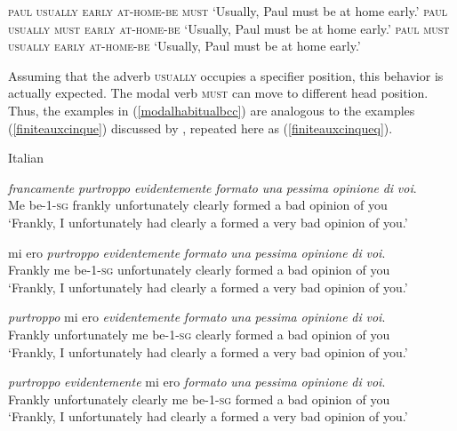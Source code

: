 \begin{exe}
\ex\label{modalhabitualbcc}\begin{xlist} 
\ex \textsc{paul usually early at-home-be must}
\glt `Usually, Paul must be at home early.'
\ex \textsc{paul usually must early at-home-be}
\glt `Usually, Paul must be at home early.'
\ex \textsc{paul must usually early at-home-be}
\glt `Usually, Paul must be at home early.'
\end{xlist}
\end{exe} 

\noindent Assuming that the adverb \textsc{usually} occupies a specifier position, this behavior is actually expected. The modal verb \textsc{must} can move to different head position. Thus, the examples in (\ref{modalhabitualbcc}) are analogous to the examples (\ref{finiteauxcinque}) discussed by \citet[49]{cinque1999adverbs}, repeated here as (\ref{finiteauxcinqueq}). 

\begin{exe} 
\ex Italian \citep[49]{cinque1999adverbs}\label{finiteauxcinqueq} \begin{xlist} 
\ex {} {\textit{francamente}} {\textit{purtroppo}} {\textit{evidentemente}} {\textit{formato}} {\textit{una}} {\textit{pessima}} {\textit{opinione}} {\textit{di}} {\textit{voi}.}  \\
{Me be-1-\textsc{sg}} {frankly} {unfortunately} {clearly} {formed} {a} {bad} {opinion} {of} {you} \\
\trans `Frankly, I unfortunately had clearly a formed a very bad opinion of you.' \label{finiteauxcinqueaq}

\ex {} {mi ero} {\textit{purtroppo}} {\textit{evidentemente}} {\textit{formato}} {\textit{una}} {\textit{pessima}} {\textit{opinione}} {\textit{di}} {\textit{voi}.}  \\
 {Frankly} {me be-1-\textsc{sg}} {unfortunately} {clearly} {formed} {a} {bad} {opinion} {of} {you} \\
\trans `Frankly, I unfortunately had clearly a formed a very bad opinion of you.' \label{finiteauxcinquebq}

\ex {}  {\textit{purtroppo}} {mi ero} {\textit{evidentemente}} {\textit{formato}} {\textit{una}} {\textit{pessima}} {\textit{opinione}} {\textit{di}} {\textit{voi}.}  \\
 {Frankly}  {unfortunately} {me be-1-\textsc{sg}} {clearly} {formed} {a} {bad} {opinion} {of} {you} \\
\trans `Frankly, I unfortunately had clearly a formed a very bad opinion of you.' \label{finiteauxcinquecq}

\ex {}  {\textit{purtroppo}}  {\textit{evidentemente}} {mi ero} {\textit{formato}} {\textit{una}} {\textit{pessima}} {\textit{opinione}} {\textit{di}} {\textit{voi}.}  \\
 {Frankly}  {unfortunately}  {clearly} {me be-1-\textsc{sg}} {formed} {a} {bad} {opinion} {of} {you} \\
\trans `Frankly, I unfortunately had clearly a formed a very bad opinion of you.' \label{finiteauxcinquecq}

\end{xlist} 
\end{exe}

